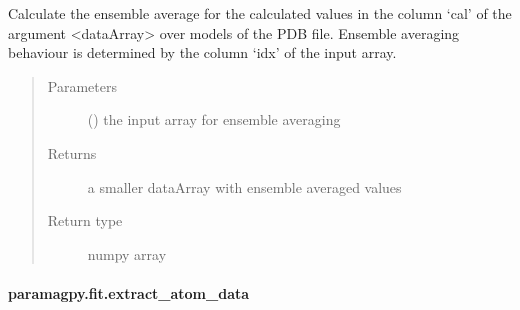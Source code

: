 \documentclass[a4paper,10pt,english,openany,oneside]{sphinxmanual}
\begin{document}
\begin{fulllineitems}
\label{\detokenize{reference/generated/paramagpy.fit.ensemble_average:paramagpy.fit.ensemble_average}}
Calculate the ensemble average for the calculated values in the
column ‘cal’ of the argument \textless{}dataArray\textgreater{} over models of the
PDB file.
Ensemble averaging behaviour is determined by the column ‘idx’
of the input array.
\begin{quote}\begin{description}
\item[{Parameters}] \leavevmode
{} () \textendash{} the input array for ensemble averaging

\item[{Returns}] \leavevmode
{} \textendash{} a smaller dataArray with ensemble averaged values

\item[{Return type}] \leavevmode
numpy array

\end{description}\end{quote}

\end{fulllineitems}



\paragraph{paramagpy.fit.extract\_atom\_data}
\label{\detokenize{reference/generated/paramagpy.fit.extract_atom_data:paramagpy-fit-extract-atom-data}}\label{\detokenize{reference/generated/paramagpy.fit.extract_atom_data::doc}}
\end{document}
